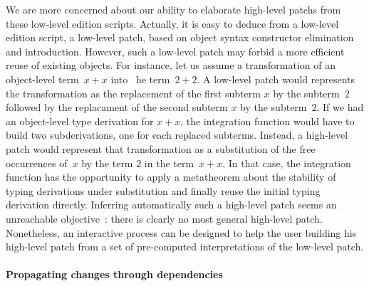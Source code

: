 \documentclass{article}
\newcommand{\remtext}[1]{}
\begin{document}
We are more concerned about our ability to elaborate high-level patchs
from these low-level edition scripts. Actually, it is easy to deduce
from a low-level edition script, a low-level patch, based on object
syntax constructor elimination and introduction. However, such a
low-level patch may forbid a more efficient reuse of existing
objects. For instance, let us assume a transformation of an
object-level term~$x + x$ into~ he term~$2 + 2$. A low-level patch
would represents the transformation as the replacement of the first
subterm $x$ by the subterm~$2$ followed by the replacament of the
second subterm $x$ by the subterm~$2$. If we had an object-level type
derivation for $x + x$, the integration function would have to build
two subderivations, one for each replaced subterms.  Instead, a
high-level patch would represent that transformation as a substitution
of the free occurrences of~$x$ by the term $2$ in the term~$x + x$. In
that case, the integration function has the opportunity to apply a
metatheorem about the stability of typing derivations under
substitution and finally reuse the initial typing derivation
directly. Inferring automatically such a high-level patch seems an
unreachable objective~: there is clearly no most general high-level
patch. Nonetheless, an interactive process can be designed to help the
user building his high-level patch from a set of pre-computed
interpretations of the low-level patch.

\remtext{Fri Jun 18, 2010 1:38 PM. Il faut différencier deux arbres de
  syntaxe. Une méthode : la distance d'édition syntaxique permet de
  déduire des applications des règles d'élimination et d'introduction
  que l'on peut utiliser pour construire $\Delta$. Référence sur la
  littérature sur les distances d'édition entre arbres. Discussion sur
  l'élaboration de patchs de haut niveau (comme le renommage etc). }

\paragraph{Propagating changes through dependencies}
\-

\remtext{Fri Jun 18, 2010 1:42 PM. Si on se contente de concaténer
  $\Delta$ à $R$, on n'a intégré qu'une nouvelle version de l'objet
  initial~$t$ dans $R$ mais on n'a pas propagé ces modifications
  auprès des clients de $t$. Cette propagation n'est \textit{a priori}
  pas triviale~: rien ne dit que $t'$ à un sens équivalent à $t$. Il
  faut donc adapter les clients en demandant un patch d'adaptation à
  l'utilisateur. On présente ces demandes sous la forme de patch à
  compléter (on fournit un peu de contexte et on a un trou pour y
  injecter une nouvelle sous-dérivation mais on peut aussi modifier le
  contexte pour l'adapter). La construction d'un patch d'adaptation
  est un processus interactif~: on ne sait pas a priori borner le
  contexte nécessaire à la construction du patchs d'adaptation donc on
  peut imaginer un sorte de jeu où le système fait augmenter le
  contexte (en suivant les dépendances) si l'utilisateur ne sait pas
  construire le patch d'adaptation. En passant, quand on parle d'utilisateur
  ici, ce peut être aussi bien un programme, comme un type-checker
  pour le langage objet, ou bien un programmeur.}
\end{document}
